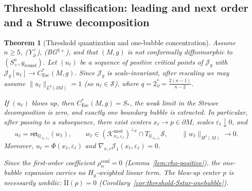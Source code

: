 \documentclass[11pt,reqno,a4paper]{amsart}
\numberwithin{equation}{section}
\theoremstyle{plain}
\newtheorem{theorem}{Theorem}[section]
\newcommand{\Esc}{\ensuremath{\mathrm{Esc}}}
\theoremstyle{remark}
\theoremstyle{plain}
\begin{document}
\subsection{Threshold classification: leading and next order and a Struwe decomposition}

\begin{theorem}[Threshold quantization and one-bubble concentration]\label{thm:threshold-leading}
Assume $n\ge5$, \textup{(Y$^+_{\partial}$)}, \textup{(BG$^{3+}$)}, and that
$(M,g)$ is not conformally diffeomorphic to $(S^n_+,g_{\mathrm{round}})$.
Let $(u_\ell)$ be a sequence of positive critical points of $\mathcal J_g$ with
$\mathcal J_g[u_\ell]\to C^*_{\Esc}(M,g)$.
Since $\mathcal J_g$ is scale-invariant, after rescaling we may assume
$\|u_\ell\|_{L^q(\partial M)}=1$ (so $u_\ell\in\mathcal S$), where
$q=2^*_{\partial}=\frac{2(n-1)}{n-2}$.

If $(u_\ell)$ blows up, then $C^*_{\Esc}(M,g)=S_\ast$, the weak limit in the
Struwe decomposition is zero, and exactly one boundary bubble is extracted.
In particular, after passing to a subsequence, there exist
centers $x_\ell\to p\in\partial M$, scales $\varepsilon_\ell\downarrow0$, and
\begin{equation}\label{eq:onebubble-decomp}
u_\ell=\mathsf{ret}_{\mathcal U_{x_\ell,\varepsilon_\ell}}(w_\ell),
\qquad
w_\ell\in(\mathcal K^{\mathrm{mod}}_{x_\ell,\varepsilon_\ell})^{\perp_E}
\cap T_{\mathcal U_{x_\ell,\varepsilon_\ell}}\mathcal S,
\qquad
\|w_\ell\|_{H^1(M)}\to0.
\end{equation}
Moreover,
$u_\ell=\Phi(x_\ell,\varepsilon_\ell)$
and
$\nabla_{x,\varepsilon}\mathcal J_1(x_\ell,\varepsilon_\ell)=0$.

Since the first-order coefficient $\rho_n^{\mathrm{conf}}=0$ (Lemma~\ref{lem:rho-positive}),
the one-bubble expansion carries no $H_g$-weighted linear term.
The blow-up center $p$ is necessarily umbilic:
$\mathring{\mathrm{II}}(p)=0$
(Corollary~\ref{cor:threshold-Sstar-onebubble}).
\end{theorem}
\end{document}
